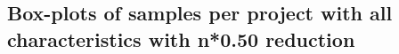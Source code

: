 \begin{appendices}
\section{Box-plots of samples per project with all characteristics with n*0.50 reduction}
\label{ap:full_50}
\begin{figure}[h]
    \centering
    \qquad
\end{figure}


\end{appendices}
